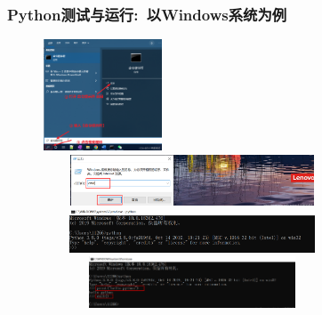 \begin{frame}
	\frametitle{\textrm{Python}测试与运行:~以\textrm{Windows}系统为例}
\begin{figure}[h!]
\vspace*{-0.15in}
\centering
\includegraphics[height=1.3in, width=1.4in, viewport=0 0 724 627,clip]{Figures/python_config-windows-6.png}\\
\includegraphics[height=0.6in, width=3.5in, viewport=0 0 1484 312,clip]{Figures/python_command-windows-1.png}
\includegraphics[height=0.5in, width=3.5in, viewport=0 0 1496 261,clip]{Figures/python_command-windows-2.png}
\includegraphics[height=0.6in, width=3.5in, viewport=0 0 1559 387,clip]{Figures/python_command-windows-3.png}
\label{Python-run_windows}
\end{figure}
\end{frame}

